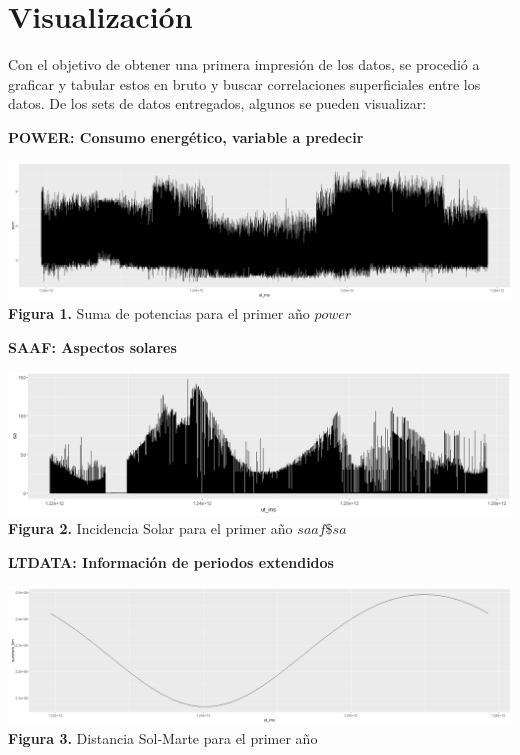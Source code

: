 \documentclass[../Main.tex]{subfiles}
\begin{document}
\section{Visualización}
Con el objetivo de obtener una primera impresión de los datos, se procedió a graficar y tabular estos en bruto y buscar correlaciones superficiales entre los datos. De los sets de datos entregados, algunos se pueden visualizar:
\newline \par

\textbf{POWER: Consumo energético, variable a predecir}
\begin{center}
\includegraphics[width=\linewidth, clip]{Assets/powerSum.png}
\textbf{Figura 1.} Suma de potencias para el primer año $power$
\end{center}

\textbf{SAAF: Aspectos solares}
\begin{center}
\includegraphics[width=\linewidth, clip]{Assets/saaf1saAll-Stretch.png}
\textbf{Figura 2.} Incidencia Solar para el primer año $saaf\$sa$
\end{center}

\textbf{LTDATA: Información de periodos extendidos}
\begin{center}
\includegraphics[width=\linewidth, clip]{Assets/sunMars_km.png}
\textbf{Figura 3.} Distancia Sol-Marte para el primer año
\end{center}
\end{document}
